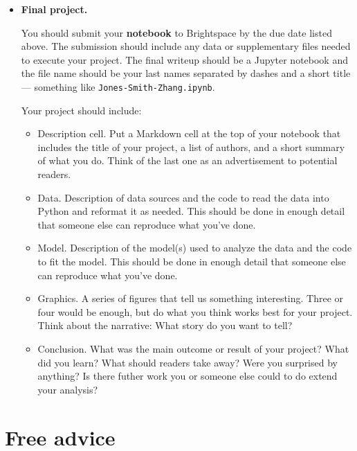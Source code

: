 \documentclass[11pt]{article}
\begin{document}
\begin{itemize}
      \item {\bf Final project.}

            You should submit your {\bf notebook\/} to Brightspace by the due date
            listed above. The submission should include any data or supplementary files
            needed to execute your project. The final writeup should be a Jupyter
            notebook and the file name should be your last names separated by dashes and
            a short title --- something like {\tt Jones-Smith-Zhang.ipynb}.

            Your project should include:
            \begin{itemize}
                  \item Description cell.  Put a Markdown cell at the top of your notebook that
                        includes the title of your project, a list of authors, and a short summary of
                        what you do.  Think of the last one as an advertisement to potential readers.
                  \item Data.  Description of data sources and the code to read the data into
                        Python and reformat it as needed. This should be done in enough detail that
                        someone else can reproduce what you've done.
                  \item Model.  Description of the model(s) used to analyze the data and
                        the code to fit the model. This should be done in enough detail
                        that someone else can reproduce what you've done.
                  \item Graphics.  A series of figures that tell us something interesting. Three
                        or four would be enough, but do what you think works best for your project.
                        Think about the narrative:  What story do you want to tell?
                  \item Conclusion. What was the main outcome or result of your project?
                        What did you learn? What should readers take away? Were you surprised
                        by anything? Is there futher work you or someone else could to do
                        extend your analysis?
            \end{itemize}

\end{itemize}


\section*{Free advice}
\end{document}
